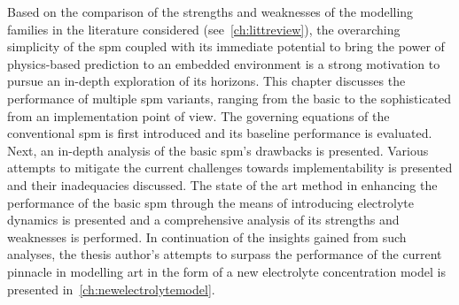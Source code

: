 




Based  on the  comparison  of  the strengths  and  weaknesses  of the  modelling
families   in   the   literature  considered   (see~\cref{ch:littreview}),   the
overarching simplicity of the \gls{spm}  coupled with its immediate potential to
bring the  power of  physics-based prediction  to an  embedded environment  is a
strong  motivation to  pursue  an  in-depth exploration  of  its horizons.  This
chapter discusses the  performance of multiple \gls{spm}  variants, ranging from
the  basic to  the  sophisticated  from an  implementation  point  of view.  The
governing  equations  of the  conventional  \gls{spm}  is first  introduced  and
its  baseline  performance is  evaluated.  Next,  an  in-depth analysis  of  the
basic  \gls{spm}'s drawbacks  is  presented. Various  attempts  to mitigate  the
current challenges towards implementability  is presented and their inadequacies
discussed. The state of the art method in enhancing the performance of the basic
\gls{spm} through the means of introducing electrolyte dynamics is presented and
a  comprehensive analysis  of  its  strengths and  weaknesses  is performed.  In
continuation  of the  insights gained  from such  analyses, the  thesis author's
attempts  to  surpass the  performance  of  the  current pinnacle  in  modelling
art  in  the  form  of  a  new  electrolyte  concentration  model  is  presented
in~\cref{ch:newelectrolytemodel}.










